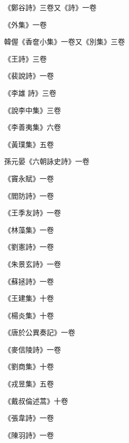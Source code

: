 \begin{pinyinscope}
 《鄭谷詩》三卷又《詩》一卷



 《外集》一卷



 韓偓《香奩小集》一卷又《別集》三卷



 《王詩》三卷



 《裴說詩》一卷



 《李雄
 詩》三卷



 《說李中集》三卷



 《李善夷集》六卷



 《黃璞集》五卷



 孫元晏《六朝詠史詩》一卷



 《竇永賦》一卷



 《閻防詩》一卷



 《王季友詩》一卷



 《林藻集》一卷



 《劉憲詩》一卷



 《朱景玄詩》一卷



 《蘇拯詩》一卷



 《王建集》十卷



 《楊炎集》十卷



 《唐於公異奏記》一卷



 《麥信陵詩》一卷



 《劉商集》十卷



 《戎昱集》五卷



 《戴叔倫述蒿》十卷



 《張韋詩》一卷



 《陳羽詩》一卷




\end{pinyinscope}
